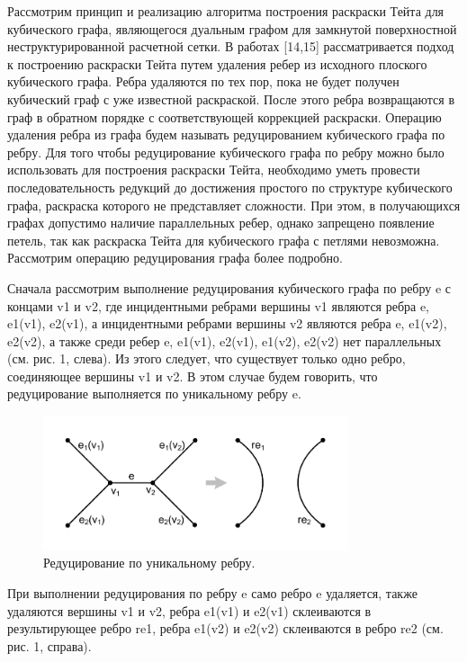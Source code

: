Рассмотрим принцип и реализацию алгоритма построения раскраски Тейта для кубического графа, являющегося дуальным графом для замкнутой поверхностной неструктурированной расчетной сетки.
В работах [14,15] рассматривается подход к построению раскраски Тейта путем удаления ребер из исходного плоского кубического графа.
Ребра удаляются по тех пор, пока не будет получен кубический граф с уже известной раскраской.
После этого ребра возвращаются в граф в обратном порядке с соответствующей коррекцией раскраски. Операцию удаления ребра из графа будем называть редуцированием кубического графа по ребру.
Для того чтобы редуцирование кубического графа по ребру можно было использовать для построения раскраски Тейта, необходимо уметь провести последовательность редукций до достижения простого по структуре кубического графа, раскраска которого не представляет сложности.
При этом, в получающихся графах допустимо наличие параллельных ребер, однако запрещено появление петель, так как раскраска Тейта для кубического графа с петлями невозможна. Рассмотрим операцию редуцирования графа более подробно.

Сначала рассмотрим выполнение редуцирования кубического графа по ребру e с концами v1 и v2, где инцидентными ребрами вершины v1 являются ребра e, e1(v1), e2(v1), а инцидентными ребрами вершины v2 являются ребра e, e1(v2), e2(v2), а также среди ребер e, e1(v1), e2(v1), e1(v2), e2(v2) нет параллельных (см. рис. 1, слева).
Из этого следует, что существует только одно ребро, соединяющее вершины v1 и v2. В этом случае будем говорить, что редуцирование выполняется по уникальному ребру e.

\begin{figure}[ht]
	\centering
		\includegraphics[width=0.8\textwidth]{./pics/text_3_edge_coloring/1-pic-reduce-edge-type-1.pdf}
	\caption{Редуцирование по уникальному ребру.}
	\label{fig:text_3_edge_coloring_1}
\end{figure}

При выполнении редуцирования по ребру e само ребро e удаляется, также удаляются вершины v1 и v2, ребра e1(v1) и e2(v1) склеиваются в результирующее ребро re1, ребра e1(v2) и e2(v2) склеиваются в ребро re2 (см. рис. 1, справа).

